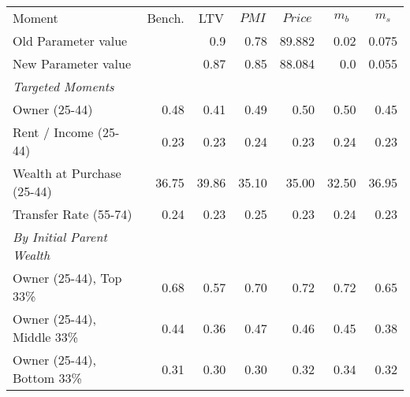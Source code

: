 \begin{tabular}{l rrrrrr}
\toprule
Moment & \multicolumn{1}{c}{Bench.} & \multicolumn{1}{c}{LTV} & \multicolumn{1}{c}{$PMI$} & \multicolumn{1}{c}{$Price$} & \multicolumn{1}{c}{$m_b$ } & \multicolumn{1}{c}{$m_s$}\\
\; Old Parameter value &  & 0.9 & 0.78 & 89.882 & 0.02 & 0.075 \\ 
\; New Parameter value &  & 0.87 & 0.85 & 88.084 & 0.0 & 0.055 \\ 
\midrule
\textit{Targeted Moments} &  &  &  &  &  & \\
\;Owner (25-44) & 0.48 & 0.41 & 0.49 & 0.50 & 0.50 & 0.45\\
\;Rent / Income (25-44) & 0.23 & 0.23 & 0.24 & 0.23 & 0.24 & 0.23\\
\;Wealth at Purchase (25-44) & 36.75 & 39.86 & 35.10 & 35.00 & 32.50 & 36.95\\
\;Transfer Rate (55-74) & 0.24 & 0.23 & 0.25 & 0.23 & 0.24 & 0.23\\
\textit{By Initial Parent Wealth} &  &  &  &  &  & \\
\;Owner (25-44), Top 33\% & 0.68 & 0.57 & 0.70 & 0.72 & 0.72 & 0.65\\
\;Owner (25-44), Middle 33\% & 0.44 & 0.36 & 0.47 & 0.46 & 0.45 & 0.38\\
\;Owner (25-44), Bottom 33\% & 0.31 & 0.30 & 0.30 & 0.32 & 0.34 & 0.32\\
\bottomrule
\end{tabular}
